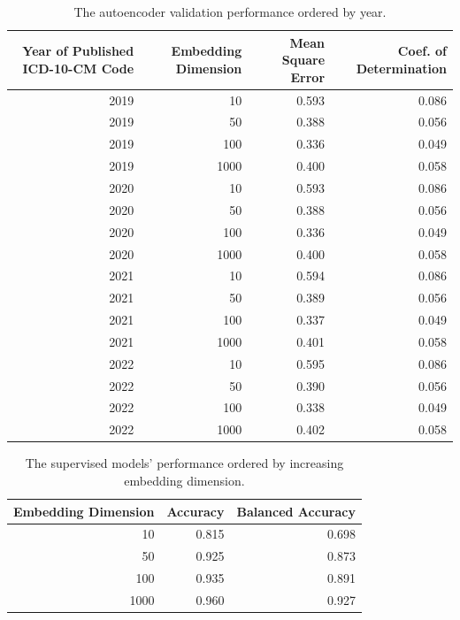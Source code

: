 \documentclass{bmcart}
\begin{document}
\begin{backmatter}
\begin{table}[ht!]
\caption{The autoencoder validation performance ordered by year.}
\label{tab:autoencoder_year}
\begin{tabular}{|r|r|r|r|}
\hline
Year of Published ICD-10-CM Code& Embedding Dimension & Mean Square Error& Coef. of Determination\\
\hline
2019 & 10 & 0.593 & 0.086\\
\hline
2019 & 50 & 0.388 & 0.056\\
\hline
2019 & 100 & 0.336 & 0.049\\
\hline
2019 & 1000 & 0.400 & 0.058\\
\hline
2020 & 10 & 0.593 & 0.086\\
\hline
2020 & 50 & 0.388 & 0.056\\
\hline
2020 & 100 & 0.336 & 0.049\\
\hline
2020 & 1000 & 0.400 & 0.058\\
\hline
2021 & 10 & 0.594 & 0.086\\
\hline
2021 & 50 & 0.389 & 0.056\\
\hline
2021 & 100 & 0.337 & 0.049\\
\hline
2021 & 1000 & 0.401 & 0.058\\
\hline
2022 & 10 & 0.595 & 0.086\\
\hline
2022 & 50 & 0.390 & 0.056\\
\hline
2022 & 100 & 0.338 & 0.049\\
\hline
2022 & 1000 & 0.402 & 0.058\\
\hline
\end{tabular}
\end{table}

\begin{table}[ht!]
\caption{The supervised models' performance ordered by increasing embedding dimension.}
\label{tab:sup_perf}
\begin{tabular}{|r|r|r|}
\hline
Embedding Dimension & Accuracy & Balanced Accuracy\\
\hline
10 & 0.815 & 0.698\\
\hline
50 & 0.925 & 0.873\\
\hline
100 & 0.935 & 0.891\\
\hline
1000 & 0.960 & 0.927\\
\hline
\end{tabular}
\end{table}



\end{backmatter}
\end{document}
